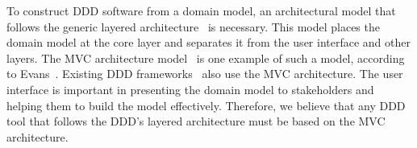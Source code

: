 To construct DDD software from a domain model, an architectural model that follows the generic layered architecture~\cite{evans_domain-driven_2004, vernon_implementing_2013} is necessary. This model places the domain model at the core layer and separates it from the user interface and other layers. The MVC architecture model~\cite{krasner_description_1988} is one example of such a model, according to Evans~\cite{evans_domain-driven_2004}. Existing DDD frameworks~\cite{dan_haywood_apache_2013,paniza_learn_2011} also use the MVC architecture. The user interface is important in presenting the domain model to stakeholders and helping them to build the model effectively. Therefore, we believe that any DDD tool that follows the DDD's layered architecture must be based on the MVC architecture.

